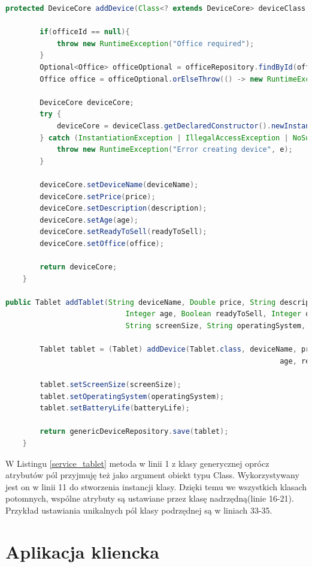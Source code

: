 \begin{lstlisting}[language=Java, style=JavaStyle,  caption={Dodawanie Tabletu z wykorzystaniem klasy nadrzędnej}, label={service_tablet}]
protected DeviceCore addDevice(Class<? extends DeviceCore> deviceClass, String deviceName, Double price, String description, Integer age, Boolean readyToSell, Integer officeId) {

        if(officeId == null){
            throw new RuntimeException("Office required");
        }
        Optional<Office> officeOptional = officeRepository.findById(officeId);
        Office office = officeOptional.orElseThrow(() -> new RuntimeException("Office not found with id: " + officeId));

        DeviceCore deviceCore;
        try {
            deviceCore = deviceClass.getDeclaredConstructor().newInstance();
        } catch (InstantiationException | IllegalAccessException | NoSuchMethodException | InvocationTargetException e) {
            throw new RuntimeException("Error creating device", e);
        }

        deviceCore.setDeviceName(deviceName);
        deviceCore.setPrice(price);
        deviceCore.setDescription(description);
        deviceCore.setAge(age);
        deviceCore.setReadyToSell(readyToSell);
        deviceCore.setOffice(office);

        return deviceCore;
    }

public Tablet addTablet(String deviceName, Double price, String description,
                            Integer age, Boolean readyToSell, Integer officeId,
                            String screenSize, String operatingSystem, String batteryLife){

        Tablet tablet = (Tablet) addDevice(Tablet.class, deviceName, price, description,
                                                                age, readyToSell, officeId);

        tablet.setScreenSize(screenSize);
        tablet.setOperatingSystem(operatingSystem);
        tablet.setBatteryLife(batteryLife);

        return genericDeviceRepository.save(tablet);
    }

\end{lstlisting}

W Listingu \ref{service_tablet} metoda w linii 1 z klasy generycznej oprócz atrybutów pól przyjmuję też jako argument obiekt typu Class. Wykorzystywany jest on w linii 11 do stworzenia instancji klasy. Dzięki temu we wszystkich klasach potomnych, wspólne atrybuty są ustawiane przez klasę nadrzędną(linie 16-21). Przykład ustawiania unikalnych pól klasy podrzędnej są w liniach 33-35.

\section {Aplikacja kliencka}